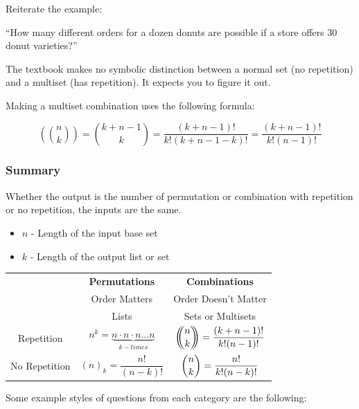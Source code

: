 \documentclass{article}
\begin{document}
Reiterate the example:

\begin{center}
    ``How many different orders for a dozen donuts are possible if a store offers 30 donut varieties?''
\end{center}

The textbook makes no symbolic distinction between a normal set (no repetition) and a multiset (has repetition). It expects you to figure it out. \medskip

Making a multiset combination uses the following formula:

\begin{equation*}
    \left(\!\!\! \binom{n}{k} \!\!\!\right) = \binom{k+n-1}{k} = \dfrac{(k+n-1)!}{k!(k+n-1-k)!} = \dfrac{(k+n-1)!}{k!(n-1)!}
\end{equation*}

\subsubsection{Summary}

Whether the output is the number of permutation or combination with repetition or no repetition, the inputs are the same.

\begin{itemize}
    \item $n$ - Length of the input base set
    \item $k$ - Length of the output list or set
\end{itemize}

\begin{center}
\begin{tabular}{|c|c|c|}
    \hline
    & \textbf{Permutations} & \textbf{Combinations} \\
    & Order Matters & Order Doesn't Matter \\
    & Lists & Sets or Multisets \\
    \hline
    Repetition & $n^{k} = \underbrace{n \cdot n \cdot n \dots n}_{k-times}$ & $ \left(\!\!\! \dbinom{n}{k} \!\!\!\right) = \dfrac{(k+n-1)!}{k!(n-1)!} $ \\
    \hline
    No Repetition & $(n)_{k} = \dfrac{n!}{(n-k)!}$ & $\dbinom{n}{k} = \dfrac{n!}{k!(n-k)!}$ \\
    \hline
\end{tabular}
\end{center}

Some example styles of questions from each category are the following:
\end{document}
